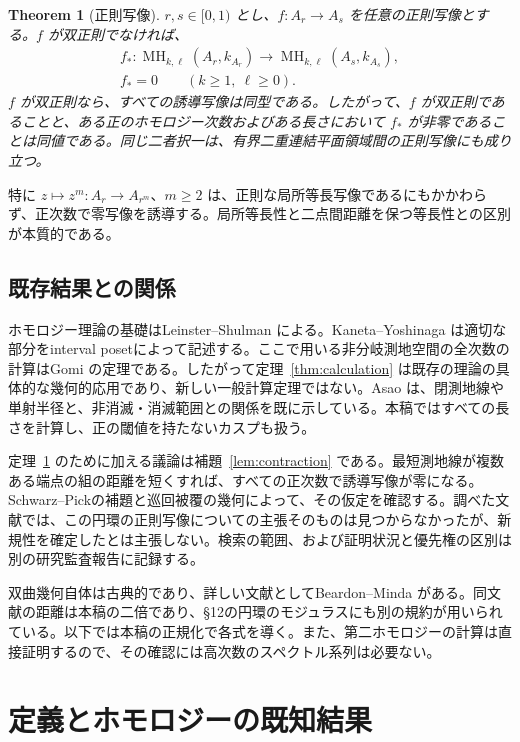 \documentclass[12pt]{amsart}
\newtheorem{thm}{Theorem}[section]
\theoremstyle{definition}
\theoremstyle{remark}
\numberwithin{equation}{section}
\DeclareMathOperator{\MH}{MH}
\begin{document}
\begin{thm}[正則写像]\label{thm:maps}
$r,s\in[0,1)$ とし、$f:A_r\to A_s$ を任意の正則写像とする。$f$ が双正則でなければ、
\begin{equation}\label{eq:map-zero}
\begin{gathered}
 f_*:\MH_{k,\ell}(A_r,k_{A_r})\longrightarrow\MH_{k,\ell}(A_s,k_{A_s}),\\
 f_*=0\qquad(k\ge1,\ \ell\ge0).
\end{gathered}
\end{equation}
$f$ が双正則なら、すべての誘導写像は同型である。したがって、$f$ が双正則であることと、ある正のホモロジー次数およびある長さにおいて $f_*$ が非零であることは同値である。同じ二者択一は、有界二重連結平面領域間の正則写像にも成り立つ。
\end{thm}
特に $z\mapsto z^m:A_r\to A_{r^m}$、$m\ge2$ は、正則な局所等長写像であるにもかかわらず、正次数で零写像を誘導する。局所等長性と二点間距離を保つ等長性との区別が本質的である。

\subsection*{既存結果との関係}
ホモロジー理論の基礎はLeinster--Shulman \cite[Definitions 3.3--3.4]{LS} による。Kaneta--Yoshinaga \cite{KY} は適切な部分をinterval posetによって記述する。ここで用いる非分岐測地空間の全次数の計算はGomi \cite[Theorem 5.22]{Gomi} の定理である。したがって定理~\ref{thm:calculation} は既存の理論の具体的な幾何的応用であり、新しい一般計算定理ではない。Asao \cite[Theorem 5.3, Corollary 6.5]{Asao} は、閉測地線や単射半径と、非消滅・消滅範囲との関係を既に示している。本稿ではすべての長さを計算し、正の閾値を持たないカスプも扱う。

定理~\ref{thm:maps} のために加える議論は補題~\ref{lem:contraction} である。最短測地線が複数ある端点の組の距離を短くすれば、すべての正次数で誘導写像が零になる。Schwarz--Pickの補題と巡回被覆の幾何によって、その仮定を確認する。調べた文献では、この円環の正則写像についての主張そのものは見つからなかったが、新規性を確定したとは主張しない。検索の範囲、および証明状況と優先権の区別は別の研究監査報告に記録する。

双曲幾何自体は古典的であり、詳しい文献としてBeardon--Minda \cite[\S\S3,10,12]{BM} がある。同文献の距離は本稿の二倍であり、\S12の円環のモジュラスにも別の規約が用いられている。以下では本稿の正規化で各式を導く。また、第二ホモロジーの計算は直接証明するので、その確認には高次数のスペクトル系列は必要ない。

\section{定義とホモロジーの既知結果}\label{sec:prelim}
\end{document}
